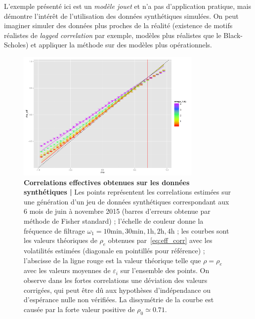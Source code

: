 L'exemple présenté ici est un \emph{modèle jouet} et n'a pas d'application pratique, mais démontre l'intérêt de l'utilisation des données synthétiques simulées. On peut imaginer simuler des données plus proches de la réalité (existence de motifs réalistes de \emph{lagged correlation} par exemple, modèles plus réalistes que le Black-Scholes) et appliquer la méthode sur des modèles plus opérationnels.





\begin{figure}%
\centering
\includegraphics[width=0.8\textwidth,height=0.3\textheight]{figures/effectiveCorrs_withGoodTh_A4}
\caption{\small\textbf{Correlations effectives obtenues sur les données synthétiques | } Les points représentent les correlations estimées sur une génération d'un jeu de données synthétiques correspondant aux 6 mois de juin à novembre 2015 (barres d'erreurs obtenue par méthode de Fisher standard) ; l'échelle de couleur donne la fréquence de filtrage $\omega_1=10\textrm{min},30\textrm{min},1\textrm{h},2\textrm{h},4\textrm{h}$ ; les courbes sont les valeurs théoriques de $\rho_e$ obtenues par~\ref{eq:eff_corr} avec les volatilités estimées (diagonale en pointillés pour référence) ; l'abscisse de la ligne rouge est la valeur théorique telle que $\rho = \rho_e$ avec les valeurs moyennes de $\varepsilon_i$ sur l'ensemble des points. On observe dans les fortes correlations une déviation des valeurs corrigées, qui peut être dû aux hypothèses d'indépendance ou d'espérance nulle non vérifiées. La dissymétrie de la courbe est causée par la forte valeur positive de $\rho_0 \simeq 0.71$.}
\label{fig:effective_corrs}
\end{figure}


